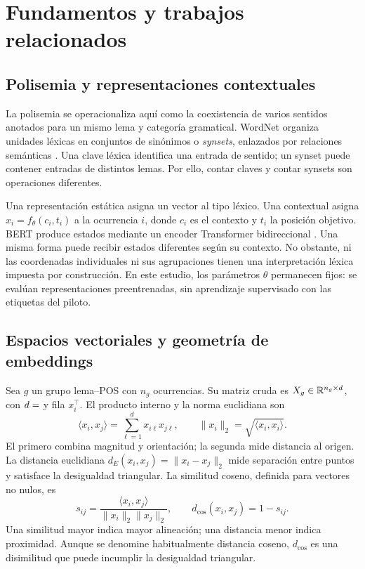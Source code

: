 \section{Fundamentos y trabajos relacionados}
\subsection{Polisemia y representaciones contextuales}
La polisemia se operacionaliza aquí como la coexistencia de varios sentidos anotados para un mismo lema y categoría gramatical. WordNet organiza unidades léxicas en conjuntos de sinónimos o \emph{synsets}, enlazados por relaciones semánticas \parencite{miller1995}. Una clave léxica identifica una entrada de sentido; un synset puede contener entradas de distintos lemas. Por ello, contar claves y contar synsets son operaciones diferentes.

Una representación estática asigna un vector al tipo léxico. Una contextual asigna $x_i=f_\theta(c_i,t_i)$ a la ocurrencia $i$, donde $c_i$ es el contexto y $t_i$ la posición objetivo. BERT produce estados mediante un encoder Transformer bidireccional \parencite{devlin2019}. Una misma forma puede recibir estados diferentes según su contexto. No obstante, ni las coordenadas individuales ni sus agrupaciones tienen una interpretación léxica impuesta por construcción. En este estudio, los parámetros $\theta$ permanecen fijos: se evalúan representaciones preentrenadas, sin aprendizaje supervisado con las etiquetas del piloto.

\subsection{Espacios vectoriales y geometría de embeddings}
Sea $g$ un grupo lema–POS con $n_g$ ocurrencias. Su matriz cruda es $X_g\in\mathbb{R}^{n_g\times d}$, con $d=\Num{d}$ y fila $x_i^\top$. El producto interno y la norma euclidiana son
\begin{equation}
 \langle x_i,x_j\rangle=\sum_{\ell=1}^{d}x_{i\ell}x_{j\ell},
 \qquad \|x_i\|_2=\sqrt{\langle x_i,x_i\rangle}.
\end{equation}
El primero combina magnitud y orientación; la segunda mide distancia al origen. La distancia euclidiana $d_E(x_i,x_j)=\|x_i-x_j\|_2$ mide separación entre puntos y satisface la desigualdad triangular. La similitud coseno, definida para vectores no nulos, es
\begin{equation}
 s_{ij}=\frac{\langle x_i,x_j\rangle}{\|x_i\|_2\|x_j\|_2},
 \qquad d_{\cos}(x_i,x_j)=1-s_{ij}.
\end{equation}
Una similitud mayor indica mayor alineación; una distancia menor indica proximidad. Aunque se denomine habitualmente distancia coseno, $d_{\cos}$ es una disimilitud que puede incumplir la desigualdad triangular.

